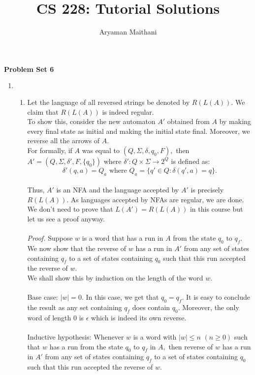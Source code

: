 \documentclass{article}
\title{CS 228: Tutorial Solutions}
\author{Aryaman Maithani}
\date{}
\begin{document}
\maketitle
\begin{center}
\textbf{Problem Set 6}
\end{center}
\begin{enumerate}[label = \arabic*.] 
	\item 
	\begin{enumerate}[label = (\alph*)] 
		\item Let the language of all reversed strings be denoted by $R(L(A)).$ We claim that $R(L(A))$ is indeed regular.\\
		To show this, consider the new automaton $A'$ obtained from $A$ by making every final state as initial and making the initial state final. Moreover, we reverse all the arrows of $A.$\\
		For formally, if $A$ was equal to $(Q, \Sigma, \delta, q_0, F),$ then $A' = (Q, \Sigma, \delta', F, \{q_0\})$ where $\delta':Q\times\Sigma\to2^{Q}$ is defined as: 
		\[\delta'(q, a) = Q_a \text{ where } Q_a = \{q' \in Q : \delta(q', a) = q\}.\]\\
		Thus, $A'$ is an NFA and the language accepted by $A'$ is precisely $R(L(A)).$ As languages accepted by NFAs are regular, we are done.\\
		We don't need to prove that $L(A') = R(L(A))$ in this course but let us see a proof anyway.\\~\\
		\emph{Proof.}
			Suppose $w$ is a word that has a run in $A$ from the state $q_0$ to $q_f.$ We now show that the reverse of $w$ has a run in $A'$ from any set of states containing $q_f$ to a set of states containing $q_0$ such that this run accepted the reverse of $w.$ \\
			We shall show this by induction on the length of the word $w.$\\~\\
			Base case: $|w| = 0.$ In this case, we get that $q_0 = q_f.$ It is easy to conclude the result as any set containing $q_f$ does contain $q_0.$ Moreover, the only word of length $0$ is $\epsilon$ which is indeed its own reverse. \\~\\
			Inductive hypothesis: Whenever $w$ is a word with $|w| \le n$ $(n \ge 0)$ such that $w$ has a run from the state $q_0$ to $q_f$ in $A,$ then reverse of $w$ has a run in $A'$ from any set of states containing $q_f$ to a set of states containing $q_0$ such that this run accepted the reverse of $w.$\\~\\

\end{enumerate}
\end{enumerate}
\end{document}
